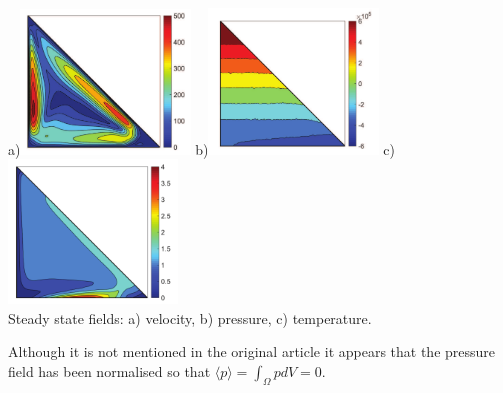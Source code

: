 \begin{center}
a)\includegraphics[width=4.5cm]{python_codes/fieldstone_51/images/jolm17_vel}
b)\includegraphics[width=4.5cm]{python_codes/fieldstone_51/images/jolm17_p}
c)\includegraphics[width=4.5cm]{python_codes/fieldstone_51/images/jolm17_T}\\
{\small Steady state fields: a) velocity, b) pressure, c) temperature.}
\end{center}

Although it is not mentioned in the original article it appears that the 
pressure field has been normalised so that $\langle p \rangle = \int_\Omega p dV=0$.

